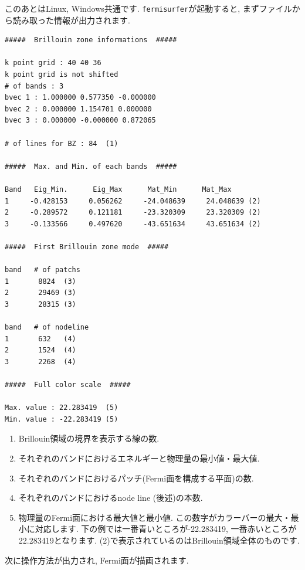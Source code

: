\documentclass[12pt]{jarticle}
\begin{document}
\vspace{0.5cm}
このあとはLinux, Windows共通です.
\verb|fermisurfer|が起動すると,
まずファイルから読み取った情報が出力されます. 

\begin{verbatim}
#####  Brillouin zone informations  ##### 

k point grid : 40 40 36 
k point grid is not shifted 
# of bands : 3 
bvec 1 : 1.000000 0.577350 -0.000000 
bvec 2 : 0.000000 1.154701 0.000000 
bvec 3 : 0.000000 -0.000000 0.872065 

# of lines for BZ : 84  (1)

#####  Max. and Min. of each bands  ##### 
     
Band   Eig_Min.      Eig_Max      Mat_Min      Mat_Max 
1     -0.428153     0.056262     -24.048639     24.048639 (2)
2     -0.289572     0.121181     -23.320309     23.320309 (2)
3     -0.133566     0.497620     -43.651634     43.651634 (2)

#####  First Brillouin zone mode  #####

band   # of patchs
1       8824  (3)
2       29469 (3)
3       28315 (3)

band   # of nodeline 
1       632   (4)
2       1524  (4)
3       2268  (4)

#####  Full color scale  ##### 

Max. value : 22.283419  (5)
Min. value : -22.283419 (5) 

\end{verbatim}

\begin{enumerate}
  \renewcommand{\labelenumi}{(\arabic{enumi})}
  \item Brillouin領域の境界を表示する線の数.
  \item それぞれのバンドにおけるエネルギーと物理量の最小値・最大値.
  \item それぞれのバンドにおけるパッチ(Fermi面を構成する平面)の数.
  \item それぞれのバンドにおけるnode line (後述)の本数.
  \item 物理量のFermi面における最大値と最小値.
    この数字がカラーバーの最大・最小に対応します. 
    下の例では一番青いところが-22.283419, 一番赤いところが22.283419となります.
    (2)で表示されているのはBrillouin領域全体のものです.    
\end{enumerate}

次に操作方法が出力され, Fermi面が描画されます. 
\end{document}
